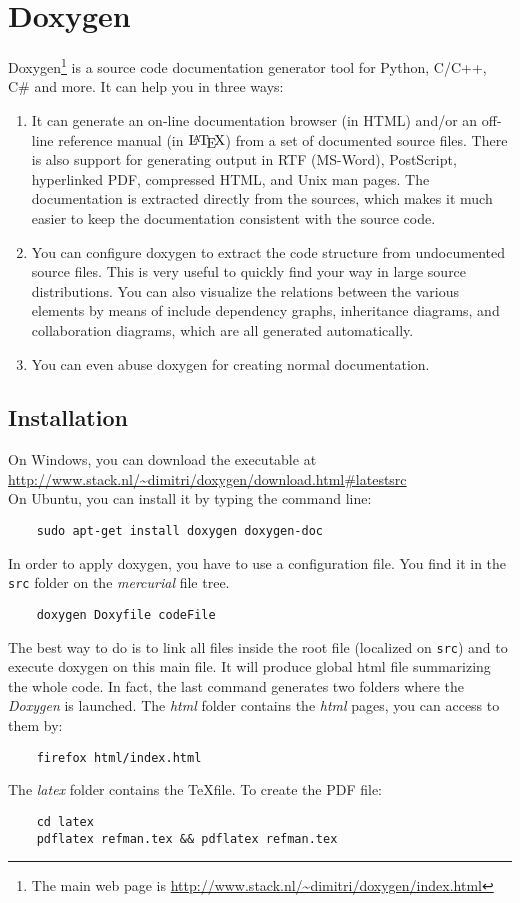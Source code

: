 \documentclass[a4paper, 12pt, oneside]{report}
\begin{document}
\section{Doxygen \label{Doxygen}}
Doxygen\footnote{The main web page is \url{http://www.stack.nl/~dimitri/doxygen/index.html}} is a source code documentation generator tool for Python, C/C++, C\# and more. It can help you in three ways:
\begin{enumerate}
	\item It can generate an on-line documentation browser (in HTML) and/or an off-line reference manual (in $\mbox{\LaTeX}$) from a set of documented source files. There is also support for generating output in RTF (MS-Word), PostScript, hyperlinked PDF, compressed HTML, and Unix man pages. The documentation is extracted directly from the sources, which makes it much easier to keep the documentation consistent with the source code.
	\item You can configure doxygen to extract the code structure from undocumented source files. This is very useful to quickly find your way in large source distributions. You can also visualize the relations between the various elements by means of include dependency graphs, inheritance diagrams, and collaboration diagrams, which are all generated automatically.
	\item You can even abuse doxygen for creating normal documentation.
\end{enumerate}



\subsection{Installation}
On Windows, you can download the executable at \\
\url{http://www.stack.nl/~dimitri/doxygen/download.html#latestsrc} \\
On Ubuntu, you can install it by typing the command line:
\begin{verbatim}
	sudo apt-get install doxygen doxygen-doc
\end{verbatim}
In order to apply doxygen, you have to use a configuration file. You find it in the \texttt{src} folder on the \textit{mercurial} file tree.
\begin{verbatim}
	doxygen Doxyfile codeFile
\end{verbatim}
The best way to do is to link all files inside the root file (localized on \texttt{src}) and to execute doxygen on this main file. It will produce global html file summarizing the whole code. In fact, the last command generates two folders where the \textit{Doxygen} is launched. The \textit{html} folder contains the \textit{html} pages, you can access to them by:
\begin{verbatim}
	firefox html/index.html
\end{verbatim}
The \textit{latex} folder contains the \TeX file. To create the PDF file:
\begin{verbatim}
	cd latex
	pdflatex refman.tex && pdflatex refman.tex
\end{verbatim}
\end{document}
